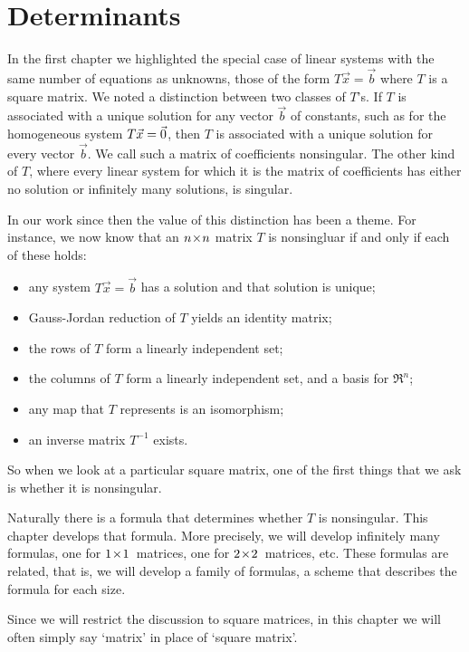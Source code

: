 \chapter{Determinants} 
In the first chapter  
we highlighted the special case of linear systems
with the same number of equations as unknowns, 
those of the form \( T\vec{x}=\vec{b} \) where $T$ is a square matrix.
We noted a distinction between two classes of $T$'s.
If $T$ is associated with a unique solution
for any vector $\vec{b}$ of constants, 
such as for the homogeneous system $T\vec{x}=\vec{0}$, then
$T$ is associated with a unique solution for every vector $\vec{b}$.
We call such a matrix of coefficients nonsingular.
The other kind of $T$, where every linear system for which it is the 
matrix of coefficients has either no solution or infinitely many solutions,
is singular.  

In our work since then the value of this distinction has been a theme.
For instance, we now know that an 
\( n \! \times \! n \) matrix \( T \) is nonsingluar if and only if
each of these holds:
\begin{itemize}
   \item any system \( T\vec{x}=\vec{b} \) has a solution 
          and that solution is unique;
   \item Gauss-Jordan reduction of $T$ yields an identity matrix;
   \item the rows of $T$ form a linearly independent set;
   \item the columns of \( T \) form a linearly independent set, 
         and a basis for \( \Re^n \);
   \item any map that \( T \) represents is an isomorphism;
   \item an inverse matrix \( T^{-1} \) exists.
\end{itemize}
So when we look at a particular square matrix, one of the first things
that we ask is whether it is  
nonsingular.

Naturally there is a formula that determines whether $T$ is nonsingular.
This chapter develops that formula. 
More precisely, we will develop infinitely many formulas, 
one for $1 \! \times \! 1$~matrices, one for $2 \! \times \! 2$~matrices, etc.
These formulas are related,  that is, 
we will develop a family of
formulas, a scheme that describes the formula for each size.

Since we will restrict the discussion to square matrices, in this chapter
we will often simply say `matrix' in place of `square matrix'.





